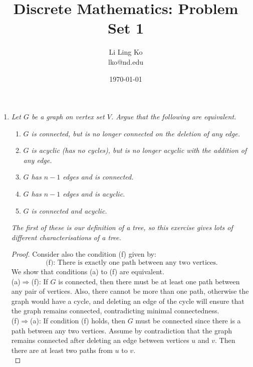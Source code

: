 \documentclass{article}
\begin{document}
\title{Discrete Mathematics: Problem Set 1}
\author{Li Ling Ko\\ lko@nd.edu}
\date{\today}
\maketitle

\begin{enumerate}[label={\bf Q\arabic*:}]
  \item \it Let $G$ be a graph on vertex set $V$. Argue that the following
    are equivalent.
    \begin{enumerate}[label={(\alph*)}]
      \item \it $G$ is connected, but is no longer connected on the
        deletion of any edge.
      \item \it $G$ is acyclic (has no cycles), but is no longer acyclic
        with the addition of any edge.
      \item \it $G$ has $n-1$ edges and is connected.
      \item \it $G$ has $n-1$ edges and is acyclic.
      \item \it $G$ is connected and acyclic.
    \end{enumerate}

    \it The first of these is our definition of a tree, so this exercise
    gives lots of different characterisations of a tree.

    \begin{proof}
      Consider also the condition (f) given by:
      \[\text{(f): There is exactly one path between any two vertices.}\]
      We show that conditions (a) to (f) are equivalent. \\

      (a)$\Rightarrow$(f): If $G$ is connected, then there must be at least
      one path between any pair of vertices. Also, there cannot be more
      than one path, otherwise the graph would have a cycle, and deleting
      an edge of the cycle will ensure that the graph remains connected,
      contradicting minimal connectedness. \\

      (f)$\Rightarrow$(a): If condition (f) holds, then $G$ must be
      connected since there is a path between any two vertices. Assume by
      contradiction that the graph remains connected after deleting an edge
      between vertices $u$ and $v$. Then there are at least two paths from
      $u$ to $v$. \\


\end{proof}
\end{enumerate}
\end{document}
